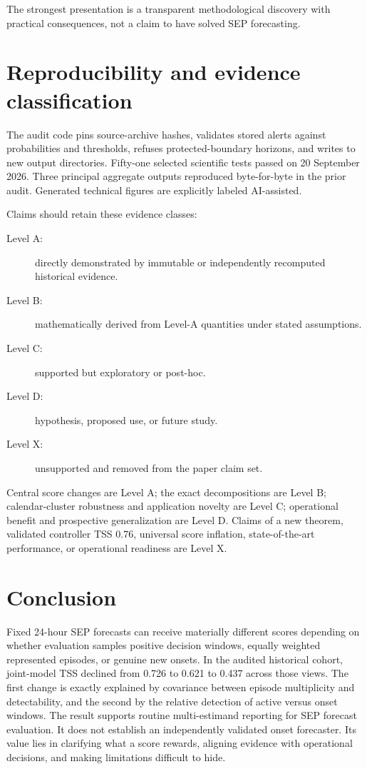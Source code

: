 \documentclass[11pt]{article}
\begin{document}
The strongest presentation is a transparent methodological discovery with practical consequences, not a claim to have solved SEP forecasting.

\section{Reproducibility and evidence classification}

The audit code pins source-archive hashes, validates stored alerts against probabilities and thresholds, refuses protected-boundary horizons, and writes to new output directories. Fifty-one selected scientific tests passed on 20 September 2026. Three principal aggregate outputs reproduced byte-for-byte in the prior audit. Generated technical figures are explicitly labeled AI-assisted.

Claims should retain these evidence classes:

\begin{description}
\item[Level A:] directly demonstrated by immutable or independently recomputed historical evidence.
\item[Level B:] mathematically derived from Level-A quantities under stated assumptions.
\item[Level C:] supported but exploratory or post-hoc.
\item[Level D:] hypothesis, proposed use, or future study.
\item[Level X:] unsupported and removed from the paper claim set.
\end{description}

Central score changes are Level A; the exact decompositions are Level B; calendar-cluster robustness and application novelty are Level C; operational benefit and prospective generalization are Level D. Claims of a new theorem, validated controller TSS 0.76, universal score inflation, state-of-the-art performance, or operational readiness are Level X.

\section{Conclusion}

Fixed 24-hour SEP forecasts can receive materially different scores depending on whether evaluation samples positive decision windows, equally weighted represented episodes, or genuine new onsets. In the audited historical cohort, joint-model TSS declined from 0.726 to 0.621 to 0.437 across those views. The first change is exactly explained by covariance between episode multiplicity and detectability, and the second by the relative detection of active versus onset windows. The result supports routine multi-estimand reporting for SEP forecast evaluation. It does not establish an independently validated onset forecaster. Its value lies in clarifying what a score rewards, aligning evidence with operational decisions, and making limitations difficult to hide.
\end{document}
